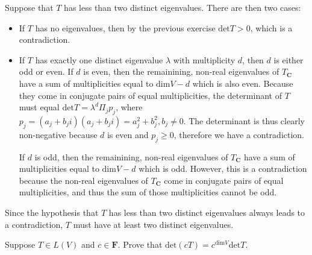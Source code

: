 \begin{solution}

    Suppose that $T$ has less than two distinct eigenvalues. There are then two cases:
    \begin{itemize}
        \item If $T$ has no eigenvalues, then by the previous exercise $\text{det} T > 0$, which is a contradiction.
        \item  If $T$ has exactly one distinct eigenvalue $\lambda$ with multiplicity $d$, then $d$ is either odd or even. If $d$ is even, then the remainining, non-real eigenvalues of $T_\mathbf{C}$ have a sum of multiplicities equal to $\text{dim} V - d$ which is also even. Because they come in conjugate pairs of equal multiplicities, the determinant of $T$ must equal $\text{det} T = \lambda^d \Pi_j p_j$, where $p_j = (a_j + b_ji)(a_j + b_ji) = a_j^2+b_j^2, b_j \neq 0$. The determinant is thus clearly non-negative because $d$ is even and $p_j \geq 0$, therefore we have a contradiction.

        If $d$ is odd, then the  remainining, non-real eigenvalues of $T_\mathbf{C}$ have a sum of multiplicities equal to $\text{dim} V - d$ which is odd. However, this is a contradiction because the non-real eigenvalues of $T_\mathbf{C}$ come in conjugate pairs of equal multiplicities, and thus the sum of those multiplicities cannot be odd.
    \end{itemize}

Since the hypothesis that $T$ has less than two distinct eigenvalues always leads to a contradiction, $T$ must have at least two distinct eigenvalues.
\end{solution}

\begin{exercise}{4}
    Suppose $T \in L(V)$ and $c \in \mathbf{F}$. Prove that $\text{det}(cT) = c^{\text{dim} V}\text{det} T$.
\end{exercise}

